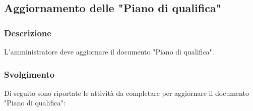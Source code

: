 \subsection{Aggiornamento delle "Piano di qualifica"}
\label{aggiornare-pdq}

\subsubsection{Descrizione}

L'amministratore deve aggiornare il documento "Piano di qualifica".

\subsubsection{Svolgimento}
Di seguito sono riportate le attività da completare per aggiornare il documento
"Piano di qualifica":
